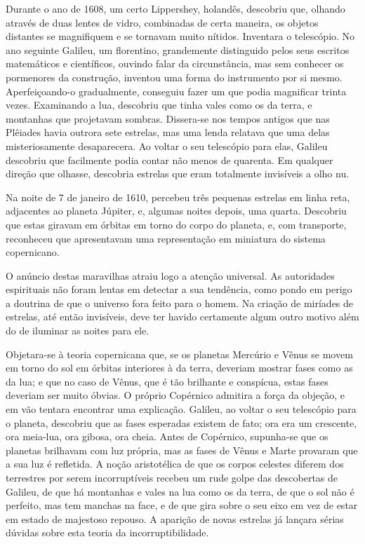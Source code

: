 \documentclass[11pt,a5paper,twoside,openany]{book}
\begin{document}
Durante o ano de 1608, um certo Lippershey, holandês, descobriu que, olhando através de duas lentes de vidro, combinadas de certa maneira, os objetos distantes se magnifiquem e se tornavam muito nítidos. Inventara o telescópio. No ano seguinte Galileu, um florentino, grandemente distinguido pelos seus escritos matemáticos e científicos, ouvindo falar da circunstância, mas sem conhecer os pormenores da construção, inventou uma forma do instrumento por si mesmo. Aperfeiçoando-o gradualmente, conseguiu fazer um que podia magnificar trinta vezes. Examinando a lua, descobriu que tinha vales como os da terra, e montanhas que projetavam sombras. Dissera-se nos tempos antigos que nas Plêiades havia outrora sete estrelas, mas uma lenda relatava que uma delas misteriosamente desaparecera. Ao voltar o seu telescópio para elas, Galileu descobriu que facilmente podia contar não menos de quarenta. Em qualquer direção que olhasse, descobria estrelas que eram totalmente invisíveis a olho nu.

Na noite de 7 de janeiro de 1610, percebeu três pequenas estrelas em linha reta, adjacentes ao planeta Júpiter, e, algumas noites depois, uma quarta. Descobriu que estas giravam em órbitas em torno do corpo do planeta, e, com transporte, reconheceu que apresentavam uma representação em miniatura do sistema copernicano.

O anúncio destas maravilhas atraiu logo a atenção universal. As autoridades espirituais não foram lentas em detectar a sua tendência, como pondo em perigo a doutrina de que o universo fora feito para o homem. Na criação de miríades de estrelas, até então invisíveis, deve ter havido certamente algum outro motivo além do de iluminar as noites para ele.

Objetara-se à teoria copernicana que, se os planetas Mercúrio e Vênus se movem em torno do sol em órbitas interiores à da terra, deveriam mostrar fases como as da lua; e que no caso de Vênus, que é tão brilhante e conspícua, estas fases deveriam ser muito óbvias. O próprio Copérnico admitira a força da objeção, e em vão tentara encontrar uma explicação. Galileu, ao voltar o seu telescópio para o planeta, descobriu que as fases esperadas existem de fato; ora era um crescente, ora meia-lua, ora gibosa, ora cheia. Antes de Copérnico, supunha-se que os planetas brilhavam com luz própria, mas as fases de Vênus e Marte provaram que a sua luz é refletida. A noção aristotélica de que os corpos celestes diferem dos terrestres por serem incorruptíveis recebeu um rude golpe das descobertas de Galileu, de que há montanhas e vales na lua como os da terra, de que o sol não é perfeito, mas tem manchas na face, e de que gira sobre o seu eixo em vez de estar em estado de majestoso repouso. A aparição de novas estrelas já lançara sérias dúvidas sobre esta teoria da incorruptibilidade.
\end{document}
